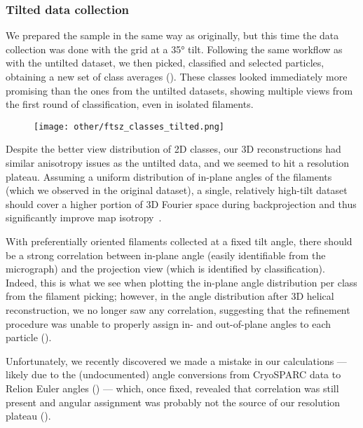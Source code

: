 \subsubsection{Tilted data collection}\label{ftsz_tilted}

We prepared the sample in the same way as originally, but this time the data collection was done with the grid at a 35° tilt.
Following the same workflow as with the untilted dataset, we then picked, classified and selected particles, obtaining a new set of class averages ().
These classes looked immediately more promising than the ones from the untilted datasets, showing multiple views from the first round of classification, even in isolated filaments. %

\begin{figure}
    \centering
    \texttt{[image: other/ftsz\_classes\_tilted.png]}
    \label{fig:ftsz_classes_tilted}
\end{figure}

Despite the better view distribution of 2D classes, our 3D reconstructions had similar anisotropy issues as the untilted data, and we seemed to hit a resolution plateau.
Assuming a uniform distribution of in-plane angles of the filaments (which we observed in the original dataset), a single, relatively high-tilt dataset should cover a higher portion of 3D Fourier space during backprojection and thus significantly improve map isotropy~\cite{tanAddressingPreferredSpecimen2017}.

With preferentially oriented filaments collected at a fixed tilt angle, there should be a strong correlation between in-plane angle (easily identifiable from the micrograph) and the projection view (which is identified by classification).
Indeed, this is what we see when plotting the in-plane angle distribution per class from the filament picking;
however, in the angle distribution after 3D helical reconstruction, we no longer saw any correlation, suggesting that the refinement procedure was unable to properly assign in- and out-of-plane angles to each particle ().

Unfortunately, we recently discovered we made a mistake in our calculations --- likely due to the (undocumented) angle conversions from CryoSPARC data to Relion Euler angles () --- which, once fixed, revealed that correlation was still present and angular assignment was probably not the source of our resolution plateau ().


